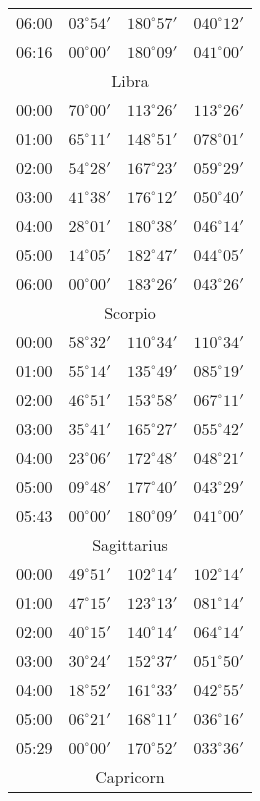 \begin{table}
\begin{Parallel}{}{}
{{\begin{tabular}{l|lll}
06:00 & $03^\circ 54'$ & $180^\circ 57'$& $040^\circ 12'$ \\
06:16 & $00^\circ 00'$ & $180^\circ 09'$& $041^\circ 00'$ \\
\multicolumn{4}{c}{Libra}\\
00:00 & $70^\circ 00'$ & $113^\circ 26'$& $113^\circ 26'$ \\
01:00 & $65^\circ 11'$ & $148^\circ 51'$& $078^\circ 01'$ \\
02:00 & $54^\circ 28'$ & $167^\circ 23'$& $059^\circ 29'$ \\
03:00 & $41^\circ 38'$ & $176^\circ 12'$& $050^\circ 40'$ \\
04:00 & $28^\circ 01'$ & $180^\circ 38'$& $046^\circ 14'$ \\
05:00 & $14^\circ 05'$ & $182^\circ 47'$& $044^\circ 05'$ \\
06:00 & $00^\circ 00'$ & $183^\circ 26'$& $043^\circ 26'$ \\
\multicolumn{4}{c}{Scorpio}\\
00:00 & $58^\circ 32'$ & $110^\circ 34'$& $110^\circ 34'$ \\
01:00 & $55^\circ 14'$ & $135^\circ 49'$& $085^\circ 19'$ \\
02:00 & $46^\circ 51'$ & $153^\circ 58'$& $067^\circ 11'$ \\
03:00 & $35^\circ 41'$ & $165^\circ 27'$& $055^\circ 42'$ \\
04:00 & $23^\circ 06'$ & $172^\circ 48'$& $048^\circ 21'$ \\
05:00 & $09^\circ 48'$ & $177^\circ 40'$& $043^\circ 29'$ \\
05:43 & $00^\circ 00'$ & $180^\circ 09'$& $041^\circ 00'$ \\
\multicolumn{4}{c}{Sagittarius}\\
00:00 & $49^\circ 51'$ & $102^\circ 14'$& $102^\circ 14'$ \\
01:00 & $47^\circ 15'$ & $123^\circ 13'$& $081^\circ 14'$ \\
02:00 & $40^\circ 15'$ & $140^\circ 14'$& $064^\circ 14'$ \\
03:00 & $30^\circ 24'$ & $152^\circ 37'$& $051^\circ 50'$ \\
04:00 & $18^\circ 52'$ & $161^\circ 33'$& $042^\circ 55'$ \\
05:00 & $06^\circ 21'$ & $168^\circ 11'$& $036^\circ 16'$ \\
05:29 & $00^\circ 00'$ & $170^\circ 52'$& $033^\circ 36'$ \\
\multicolumn{4}{c}{Capricorn}\\

\end{tabular}}}
\end{Parallel}
\end{table}
